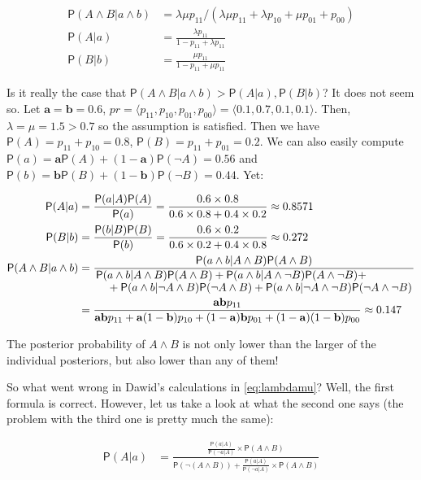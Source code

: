 \documentclass[10pt,dvipsnames,enabledeprecatedfontcommands]{scrartcl}
\newcommand{\ra}{\rangle}
\newcommand{\la}{\langle}
\newcommand{\n}{\neg}
\newcommand{\et}{\wedge}
\newcommand{\pr}[1]{\mathsf{P}(#1)}
\begin{document}
\begin{align}\label{eq:lambdamu}
 \pr{A\et B\vert  a\et b} &= \lambda \mu p_{11}/(\lambda \mu p_{11} + \lambda p_{10} +\mu p_{01} + p_{00})\\
 \pr{A\vert a} & = \frac{\lambda p_{11}}{1-p_{11}+\lambda p_{11}}\nonumber \\
 \pr{B\vert b} & = \frac{\mu p_{11}}{1-p_{11}+\mu p_{11}} \nonumber 
 \end{align}

\noindent Is it really the case that
\(\pr{A\et B\vert a\et b}>\pr{A\vert a},\pr{B\vert b}\)? It does not
seem so. Let \(\mathbf{a}=\mathbf{b}=0.6\),
\(pr =\la p_{11},p_{10},p_{01},p_{00}\ra=\la 0.1, 0.7, 0.1, 0.1 \ra\).
Then, \(\lambda=\mu=1.5>0.7\) so the assumption is satisfied. Then we
have \(\pr{A}=p_{11}+p_{10}=0.8\), \(\pr{B}=p_{11}+p_{01}=0.2\). We can
also easily compute
\(\pr{a}=\mathbf{a}\pr{A}+(1-\mathbf{a})\pr{\n A}=0.56\) and
\(\pr{b}=\mathbf{b}\pr{B}+(1-\mathbf{b})\pr{\n B}=0.44\). Yet:

\begin{align*}
 \pr{A\vert a} & = \frac{\pr{a\vert A}\pr{A}}{\pr{a}} = \frac{0.6\times 0.8}{0.6\times 0.8 + 0.4\times 0.2}\approx 0.8571 \\
 \pr{B\vert b} & = \frac{\pr{b\vert B}\pr{B}}{\pr{b}} = \frac{0.6\times 0.2}{0.6\times 0.2 + 0.4\times 0.8}\approx 0.272 \\
 \pr{A\et B \vert a \et b} & = \frac{\pr{a\et b\vert A \et B}\pr{A\et B}}{\splitfrac{\pr{a\et b \vert A\et B}\pr{A\et B}+
   \pr{a\et b\vert A\et \n B}\pr{A\et \n B} +}{+ 
 \pr{a\et b \vert \n A \et B}\pr{\n A \et B} + \pr{a\et b \vert \n A \et \n B}\pr{\n A \et \n B}}} \\
 & = \frac{\mathbf{ab}p_{11}}{
   \mathbf{ab}p_{11} + \mathbf{a}(1-\mathbf{b})p_{10} + (1-\mathbf{a})\mathbf{b}p_{01} + (1-\mathbf{a})(1-\mathbf{b})p_{00}
 }  
    \approx 0.147
 \end{align*}

The posterior probability of \(A\et B\) is not only lower than the
larger of the individual posteriors, but also lower than any of them!

So what went wrong in Dawid's calculations in \eqref{eq:lambdamu}? Well,
the first formula is correct. However, let us take a look at what the
second one says (the problem with the third one is pretty much the
same):

\begin{align*}
\pr{A\vert a } & = \frac{\frac{\pr{a\vert A}}{\pr{\n a \vert A}}\times \pr{A\et B}}{\pr{\n (A\et B)}+ \frac{\pr{a\vert A}}{\pr{\n a \vert A}} \times \pr{A\et B}}
\end{align*}
\end{document}
